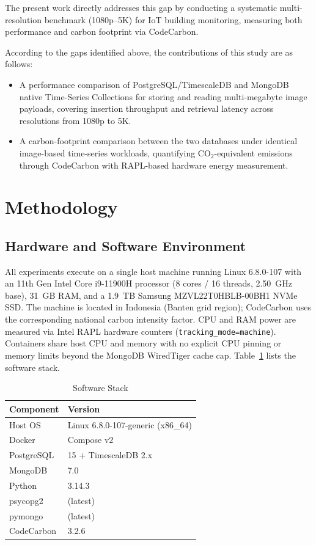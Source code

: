 \documentclass[conference]{IEEEtran}
\begin{document}
The present work directly addresses this gap by conducting a systematic multi-resolution benchmark (1080p--5K) for IoT building monitoring, measuring both performance and carbon footprint via CodeCarbon.

According to the gaps identified above, the contributions of this study are as follows:
\begin{itemize}
    \item A performance comparison of PostgreSQL/TimescaleDB and MongoDB native Time-Series Collections for storing and reading multi-megabyte image payloads, covering insertion throughput and retrieval latency across resolutions from 1080p to 5K.
    \item A carbon-footprint comparison between the two databases under identical image-based time-series workloads, quantifying CO$_2$-equivalent emissions through CodeCarbon with RAPL-based hardware energy measurement.
\end{itemize}


\section{Methodology}
\label{sec:methodology}

\subsection{Hardware and Software Environment}
All experiments execute on a single host machine running Linux 6.8.0-107 with an 11th Gen Intel Core i9-11900H processor (8 cores / 16 threads, 2.50~GHz base), 31~GB RAM, and a 1.9~TB Samsung MZVL22T0HBLB-00BH1 NVMe SSD. The machine is located in Indonesia (Banten grid region); CodeCarbon uses the corresponding national carbon intensity factor. CPU and RAM power are measured via Intel RAPL hardware counters (\texttt{tracking\_mode=machine}). Containers share host CPU and memory with no explicit CPU pinning or memory limits beyond the MongoDB WiredTiger cache cap. Table~\ref{tab:software_versions} lists the software stack.

\begin{table}[htbp]
\centering
\renewcommand{\arraystretch}{1.1}
\caption{Software Stack}
\label{tab:software_versions}
\begin{tabular}{ll}
\hline
\textbf{Component} & \textbf{Version} \\
\hline
Host OS         & Linux 6.8.0-107-generic (x86\_64) \\
Docker          & Compose v2 \\
PostgreSQL      & 15 + TimescaleDB 2.x \\
MongoDB         & 7.0 \\
Python          & 3.14.3 \\
psycopg2        & (latest) \\
pymongo         & (latest) \\
CodeCarbon      & 3.2.6 \\
\hline
\end{tabular}
\end{table}
\end{document}

